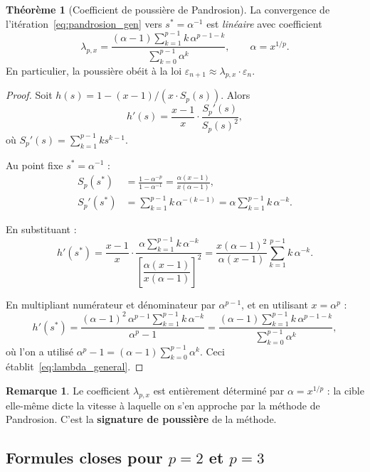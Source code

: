 \documentclass[11pt,a4paper]{article}
\theoremstyle{definition}
\newtheorem{theorem}{Théorème}[section]
\newtheorem{remark}{Remarque}[section]
\newcommand{\eps}{\varepsilon}
\begin{document}
\begin{theorem}[Coefficient de poussière de Pandrosion]
\label{thm:lambda}
La convergence de l'itération~\eqref{eq:pandrosion_gen} vers $s^* = \alpha^{-1}$ est \emph{linéaire} avec coefficient
\begin{equation}
  \label{eq:lambda_general}
  \boxed{
  \lambda_{p,x} = \frac{(\alpha - 1)\displaystyle\sum_{k=1}^{p-1} k\,\alpha^{p-1-k}}{\displaystyle\sum_{k=0}^{p-1} \alpha^k}
  }, \qquad \alpha = x^{1/p}.
\end{equation}
En particulier, la poussière obéit à la loi $\eps_{n+1} \approx \lambda_{p,x} \cdot \eps_n$.
\end{theorem}

\begin{proof}
Soit $h(s) = 1 - (x-1)/(x \cdot S_p(s))$. Alors
\[
  h'(s) = \frac{x-1}{x} \cdot \frac{S_p'(s)}{S_p(s)^2},
\]
où $S_p'(s) = \sum_{k=1}^{p-1} k s^{k-1}$.

Au point fixe $s^* = \alpha^{-1}$ :
\begin{align*}
  S_p(s^*) &= \frac{1 - \alpha^{-p}}{1 - \alpha^{-1}} = \frac{\alpha(x-1)}{x(\alpha-1)}, \\
  S_p'(s^*) &= \sum_{k=1}^{p-1} k\,\alpha^{-(k-1)} = \alpha \sum_{k=1}^{p-1} k\,\alpha^{-k}.
\end{align*}

En substituant :
\[
  h'(s^*) = \frac{x-1}{x} \cdot \frac{\alpha \sum_{k=1}^{p-1} k\,\alpha^{-k}}{\left[\dfrac{\alpha(x-1)}{x(\alpha-1)}\right]^2}
  = \frac{x(\alpha-1)^2}{\alpha(x-1)} \sum_{k=1}^{p-1} k\,\alpha^{-k}.
\]

En multipliant numérateur et dénominateur par $\alpha^{p-1}$, et en utilisant $x = \alpha^p$ :
\[
  h'(s^*) = \frac{(\alpha-1)^2\,\alpha^{p-1}\sum_{k=1}^{p-1}k\,\alpha^{-k}}{\alpha^p - 1}
  = \frac{(\alpha-1)\sum_{k=1}^{p-1}k\,\alpha^{p-1-k}}{\sum_{k=0}^{p-1}\alpha^k},
\]
où l'on a utilisé $\alpha^p - 1 = (\alpha-1)\sum_{k=0}^{p-1}\alpha^k$. Ceci établit~\eqref{eq:lambda_general}.
\end{proof}

\begin{remark}
Le coefficient $\lambda_{p,x}$ est entièrement déterminé par $\alpha = x^{1/p}$ : la cible elle-même dicte la vitesse à laquelle on s'en approche par la méthode de Pandrosion. C'est la \textbf{signature de poussière} de la méthode.
\end{remark}

\subsection{Formules closes pour \texorpdfstring{$p=2$}{p=2} et \texorpdfstring{$p=3$}{p=3}}
\end{document}

